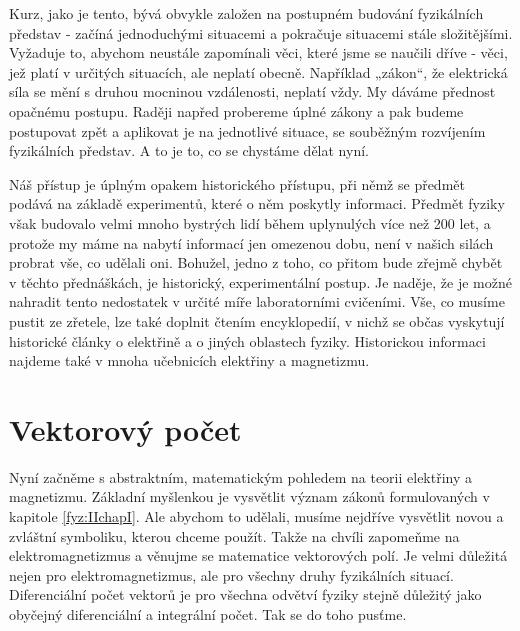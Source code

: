 
    Kurz, jako je tento, bývá obvykle založen na postupném budování fyzikálních představ - začíná 
    jednoduchými situacemi a pokračuje situacemi stále složitějšími. Vyžaduje to, abychom neustále 
    zapomínali věci, které jsme se naučili dříve - věci, jež platí v určitých situacích, ale 
    neplatí obecně. Například „zákon“, že elektrická síla se mění s druhou mocninou vzdálenosti, 
    neplatí vždy. My dáváme přednost opačnému postupu. Raději napřed probereme úplné zákony a pak 
    budeme postupovat zpět a aplikovat je na jednotlivé situace, se souběžným rozvíjením 
    fyzikálních představ. A to je to, co se chystáme dělat nyní.
    
    Náš přístup je úplným opakem historického přístupu, při němž se předmět podává na základě 
    experimentů, které o něm poskytly informaci. Předmět fyziky však budovalo velmi mnoho bystrých 
    lidí během uplynulých více než 200 let, a protože my máme na nabytí informací jen omezenou 
    dobu, není v našich silách probrat vše, co udělali oni. Bohužel, jedno z toho, co přitom bude 
    zřejmě chybět v těchto přednáškách, je historický, experimentální postup. Je naděje, že je 
    možné nahradit tento nedostatek v určité míře laboratorními cvičeními. Vše, co musíme pustit ze 
    zřetele, lze také doplnit čtením encyklopedií, v nichž se občas vyskytují historické 
    články o elektřině a o jiných oblastech fyziky. Historickou informaci najdeme také v mnoha 
    učebnicích elektřiny a magnetizmu.
    
  \section{Vektorový počet}
    Nyní začněme s abstraktním, matematickým pohledem na teorii elektřiny a magnetizmu. Základní 
    myšlenkou je vysvětlit význam zákonů formulovaných v kapitole \ref{fyz:IIchapI}. Ale abychom 
    to udělali, musíme nejdříve vysvětlit novou a zvláštní symboliku, kterou chceme použít. Takže 
    na chvíli zapomeňme na elektromagnetizmus a věnujme se matematice vektorových polí. Je velmi 
    důležitá nejen pro elektromagnetizmus, ale pro všechny druhy fyzikálních situací. Diferenciální 
    počet vektorů je pro všechna odvětví fyziky stejně důležitý jako obyčejný diferenciální a 
    integrální počet. Tak se do toho pusťme.

